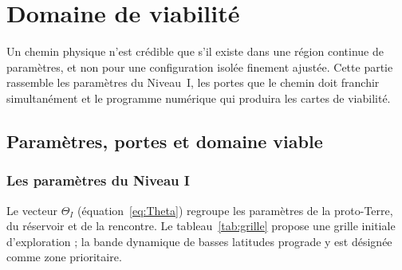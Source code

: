 \documentclass[11pt,a4paper,openany]{report}
\begin{document}
\part{Domaine de viabilité}
\label{part:viabilite}

\noindent
Un chemin physique n'est crédible que s'il existe dans une région continue de paramètres, et non
pour une configuration isolée finement ajustée. Cette partie rassemble les paramètres du
Niveau~I, les portes que le chemin doit franchir simultanément et le programme numérique qui
produira les cartes de viabilité.

\chapter{Paramètres, portes et domaine viable}
\label{ch:portes}

\section{Les paramètres du Niveau I}

Le vecteur $\Theta_I$ (équation~\eqref{eq:Theta}) regroupe les paramètres de la proto-Terre, du
réservoir et de la rencontre. Le tableau~\ref{tab:grille} propose une grille initiale d'exploration ;
la bande dynamique de basses latitudes prograde y est désignée comme zone prioritaire.
\end{document}
